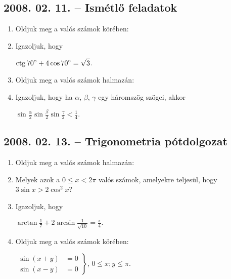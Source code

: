 \subsection*{2008. 02. 11. -- Ismétlő feladatok}
\begin{enumerate}
\item Oldjuk meg a valós számok körében:
\item Igazoljuk, hogy

$\displaystyle{\mathop{\mathrm{ctg}}\nolimits70^{\circ}+4\cos 70^{\circ}=\sqrt{3}}$.

\item Oldjuk meg a valós számok halmazán:
\item Igazoljuk, hogy ha $\alpha$, $\beta$, $\gamma$ egy háromszög szögei, akkor

$\displaystyle{\sin\frac{\alpha}{2}\sin\frac{\beta}{2}\sin\frac{\gamma}{2}<\frac{1}{4}}$.
\end{enumerate}

\subsection*{2008. 02. 13. -- Trigonometria pótdolgozat}
\begin{enumerate}
\item Oldjuk meg a valós számok halmazán:
\item Melyek azok a $0\leq x<2\pi$ valós számok, amelyekre teljesül, hogy
$3\sin x>2\cos^2x$?
\item Igazoljuk, hogy

$\displaystyle\arctan\frac{1}{7}+2\arcsin\frac{1}{\sqrt{10}}=\frac{\pi}{4}.$
\item Oldjuk meg a valós számok körében:

$\left.
\begin{aligned}
\sin(x+y)&=0\\
\sin(x-y)&=0
\end{aligned}
\right\}$, $0\leq x;y\leq\pi$.
\end{enumerate}

